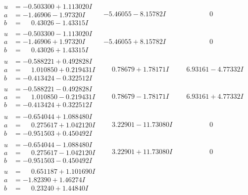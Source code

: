 \documentclass[1p]{elsarticle_modified}
\theoremstyle{definition}
\begin{document}
$$\begin{array}{c|c|c}
\begin{aligned}
u &= -0.503300 + 1.113020 I \\
a &= -1.46906 - 1.97320 I \\
b &= \phantom{-}0.43026 - 1.43315 I\end{aligned}
 & -5.46055 - 8.15782 I & \phantom{-0.000000 } 0 \\ \hline\begin{aligned}
u &= -0.503300 - 1.113020 I \\
a &= -1.46906 + 1.97320 I \\
b &= \phantom{-}0.43026 + 1.43315 I\end{aligned}
 & -5.46055 + 8.15782 I & \phantom{-0.000000 } 0 \\ \hline\begin{aligned}
u &= -0.588221 + 0.492828 I \\
a &= \phantom{-}1.010850 + 0.219431 I \\
b &= -0.413424 - 0.322512 I\end{aligned}
 & \phantom{-}0.78679 + 1.78171 I & \phantom{-}6.93161 - 4.77332 I \\ \hline\begin{aligned}
u &= -0.588221 - 0.492828 I \\
a &= \phantom{-}1.010850 - 0.219431 I \\
b &= -0.413424 + 0.322512 I\end{aligned}
 & \phantom{-}0.78679 - 1.78171 I & \phantom{-}6.93161 + 4.77332 I \\ \hline\begin{aligned}
u &= -0.654044 + 1.088480 I \\
a &= \phantom{-}0.275617 + 1.042120 I \\
b &= -0.951503 + 0.450492 I\end{aligned}
 & \phantom{-}3.22901 - 11.73080 I & \phantom{-0.000000 } 0 \\ \hline\begin{aligned}
u &= -0.654044 - 1.088480 I \\
a &= \phantom{-}0.275617 - 1.042120 I \\
b &= -0.951503 - 0.450492 I\end{aligned}
 & \phantom{-}3.22901 + 11.73080 I & \phantom{-0.000000 } 0 \\ \hline\begin{aligned}
u &= \phantom{-}0.651187 + 1.101690 I \\
a &= -1.82390 + 1.46274 I \\
b &= \phantom{-}0.23240 + 1.44840 I\end{aligned}

\end{array}$$
\end{document}

